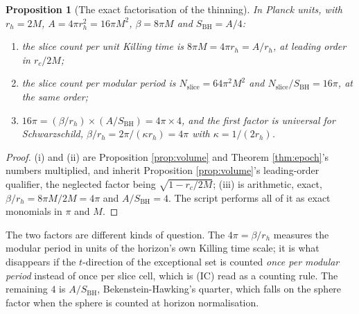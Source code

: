 \documentclass[11pt]{article}
\newtheorem{proposition}[theorem]{Proposition}
\theoremstyle{definition}
\newcommand{\SBH}{S_{\mathrm{BH}}}
\begin{document}
\begin{proposition}[The exact factorisation of the thinning]\label{prop:factor}
In Planck units, with $r_h = 2M$, $A = 4\pi r_h^2 = 16\pi M^2$, $\beta = 8\pi M$ and $\SBH = A/4$:
\begin{enumerate}
\item[(i)] the slice count per unit Killing time is $8\pi M = 4\pi r_h = A/r_h$, at leading order in $r_c/2M$;
\item[(ii)] the slice count per modular period is $N_{\mathrm{slice}} = 64\pi^2 M^2$ and $N_{\mathrm{slice}}/\SBH = 16\pi$, at the same order;
\item[(iii)] $16\pi = (\beta/r_h) \times (A/\SBH) = 4\pi \times 4$, and the first factor is universal for Schwarzschild, $\beta/r_h = 2\pi/(\kappa r_h) = 4\pi$ with $\kappa = 1/(2r_h)$.
\end{enumerate}
\end{proposition}

\begin{proof}
(i) and (ii) are Proposition \ref{prop:volume} and Theorem \ref{thm:epoch}'s numbers multiplied, and inherit Proposition \ref{prop:volume}'s leading-order qualifier, the neglected factor being $\sqrt{1 - r_c/2M}$; (iii) is arithmetic, exact, $\beta/r_h = 8\pi M/2M = 4\pi$ and $A/\SBH = 4$. The script performs all of it as exact monomials in $\pi$ and $M$.
\end{proof}

The two factors are different kinds of question. The $4\pi = \beta/r_h$ measures the modular period in units of the horizon's own Killing time scale; it is what disappears if the $t$-direction of the exceptional set is counted \emph{once per modular period} instead of once per slice cell, which is (IC) read as a counting rule. The remaining $4$ is $A/\SBH$, Bekenstein-Hawking's quarter, which falls on the sphere factor when the sphere is counted at horizon normalisation.
\end{document}
